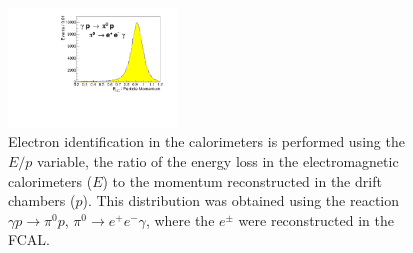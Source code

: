 \begin{figure}[tbp]
\begin{center}
\includegraphics[width=0.4\textwidth]{figures/fcal_ep.pdf}
\caption{\label{fig:performeop}
Electron identification in the calorimeters is performed using the $E/p$ variable, the ratio of the energy loss in the electromagnetic calorimeters ($E$) to the momentum reconstructed in the drift chambers ($p$).  This distribution was obtained using the reaction $\gamma p \to \pi^0 p$, $\pi^0\to e^+e^-\gamma$, where the $e^{\pm}$ were reconstructed in the FCAL.
}
\end{center}
\end{figure}



